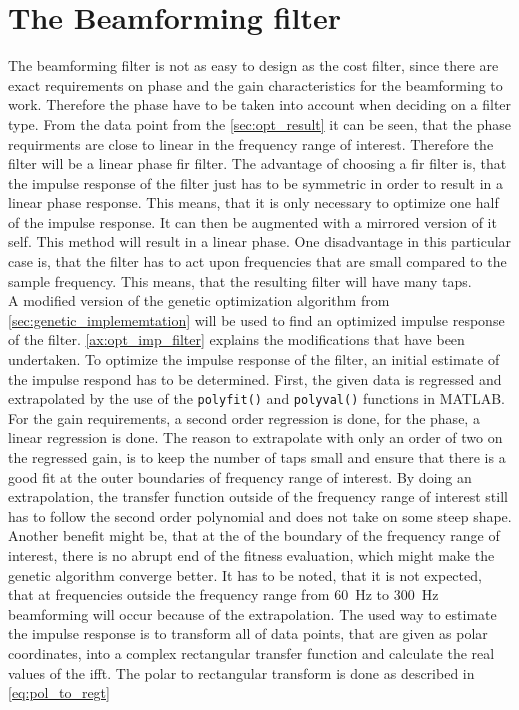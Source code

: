 \section{The Beamforming filter}
The beamforming filter is not as easy to design as the cost filter, since there are exact requirements on phase and the gain characteristics for the beamforming to work. Therefore the phase have to be taken into account when deciding on a filter type. From the data point from the \ref{sec:opt_result} it can be seen, that the phase requirments are close to linear in the frequency range of interest. Therefore the filter will be a linear phase \gls{fir} filter. The advantage of choosing a \gls{fir} filter is, that the impulse response of the filter just has to be symmetric in order to result in a linear phase response. This means, that it is only necessary to optimize one half of the impulse response. It can then be augmented with a mirrored version of it self. This method will result in a linear phase. One disadvantage in this particular case is, that the filter has to act upon frequencies that are small compared to the sample frequency. This means, that the resulting filter will have many taps. \\

A modified version of the genetic optimization algorithm from \autoref{sec:genetic_implememtation} will be used to find an optimized impulse response of the filter. \autoref{ax:opt_imp_filter} explains the modifications that have been undertaken. To optimize the impulse response of the filter, an initial estimate of the impulse respond has to be determined. First, the given data is regressed and extrapolated by the use of the \texttt{polyfit()} and \texttt{polyval()} functions in MATLAB. For the gain requirements, a second order regression is done, for the phase, a linear regression is done. The reason to extrapolate with only an order of two on the regressed gain, is to keep the number of taps small and ensure that there is a good fit at the outer boundaries of frequency range of interest. By doing an extrapolation, the transfer function outside of the frequency range of interest still has to follow the second order polynomial and does not take on some steep shape. Another benefit might be, that at the of the boundary of the frequency range of interest, there is no abrupt end of the fitness evaluation, which might make the genetic algorithm converge better. It has to be noted, that it is not expected, that at frequencies outside the frequency range from \SI{60}{\hertz} to \SI{300}{\hertz} beamforming will occur because of the extrapolation. The used way to estimate the impulse response is to transform all of data points, that are given as polar coordinates, into a complex rectangular transfer function and calculate the real values of the \gls{ifft}. The polar to rectangular transform is done as described in \autoref{eq:pol_to_regt}

